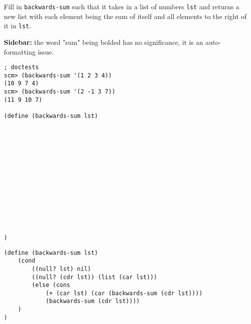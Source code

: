 \begin{blocksection}
\question
Fill in \lstinline{backwards-sum} such that it takes in a list of numbers \lstinline{lst} and returns a new list with each element being the sum of itself and all elements to the right of it in \lstinline{lst}. 

\textbf{Sidebar:} the word "sum" being bolded has no significance, it is an auto-formatting issue.

\begin{lstlisting}
; doctests
scm> (backwards-sum '(1 2 3 4))
(10 9 7 4)
scm> (backwards-sum '(2 -1 3 7))
(11 9 10 7)

(define (backwards-sum lst)














)
\end{lstlisting}
\end{blocksection}

\begin{blocksection}
\begin{solution}
\begin{lstlisting}
(define (backwards-sum lst)
    (cond 
        ((null? lst) nil)
        ((null? (cdr lst)) (list (car lst)))
        (else (cons
            (+ (car lst) (car (backwards-sum (cdr lst))))
            (backwards-sum (cdr lst))))
    )   
)
\end{lstlisting}
\end{solution}
\end{blocksection}